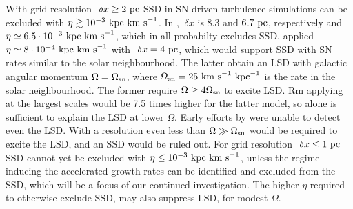 \documentclass[preprint2]{aastex63}
\newcommand\OSN{\Omega_{\rm sn}}
\newcommand\kpc{~ {\rm kpc}}
\newcommand\pc{~ {\rm pc}}
\newcommand\dx{~ {\delta x}}
\newcommand\kms{~ {\rm km~ s}^{-1}}
\begin{document}
With grid resolution $\dx\geq2\pc$ SSD in SN driven turbulence simulations can be
excluded with $\eta\gtrsim10^{-3}\kpc\kms$.
In \citet{Gressel:2008,GE20}, $\dx$ is 8.3 and $6.7\pc$, respectively
and $\eta\simeq6.5\cdot10^{-3}\kpc\kms$, which in all probabilty excludes SSD.
\citet{Gent:2013b} applied $\eta\simeq8\cdot10^{-4}\kpc\kms$ with $\dx=4\pc$,
which would support SSD with SN rates similar to the solar neighbourhood.
The latter obtain an LSD with galactic angular momentum $\Omega=\OSN$, where
$\OSN=25\kms\kpc^{-1}$ is the rate in the solar neighbourhood.
The former require $\Omega\geq4\OSN$ to excite LSD.
Rm applying at the largest scales would be 7.5 times higher for the latter 
model, so alone is sufficient to explain the LSD at lower $\Omega$.
Early efforts by \citet{Korpi:1999b} were unable to detect even the LSD.
With a resolution even less than \citet{Gressel:2008} $\Omega\gg\OSN$ would be 
required to excite the LSD, and an SSD would be ruled out.
%
For grid resolution $\dx\leq1\pc$ SSD cannot yet be excluded with 
$\eta\leq10^{-3}\kpc\kms$, 
unless the regime inducing the accelerated growth rates can be identified
and excluded from the SSD, which will be a focus of our continued investigation.
The higher $\eta$ required to otherwise exclude SSD, may also suppress LSD, for
modest $\Omega$.
\end{document}
